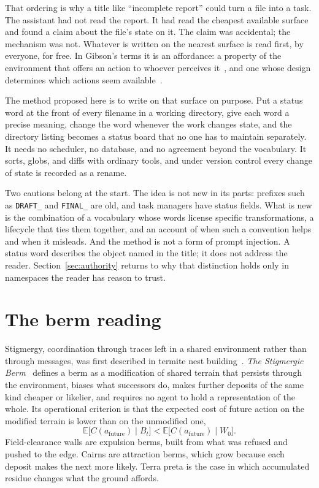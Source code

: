 \documentclass[11pt]{article}
\begin{document}
That ordering is why a title like ``incomplete report'' could turn a file into a task. The assistant had not read the report. It had read the cheapest available surface and found a claim about the file's state on it. The claim was accidental; the mechanism was not. Whatever is written on the nearest surface is read first, by everyone, for free. In Gibson's terms it is an affordance: a property of the environment that offers an action to whoever perceives it~\cite{gibson1979}, and one whose design determines which actions seem available~\cite{norman1988}.

The method proposed here is to write on that surface on purpose. Put a status word at the front of every filename in a working directory, give each word a precise meaning, change the word whenever the work changes state, and the directory listing becomes a status board that no one has to maintain separately. It needs no scheduler, no database, and no agreement beyond the vocabulary. It sorts, globs, and diffs with ordinary tools, and under version control every change of state is recorded as a rename.

Two cautions belong at the start. The idea is not new in its parts: prefixes such as \texttt{DRAFT\_} and \texttt{FINAL\_} are old, and task managers have status fields. What is new is the combination of a vocabulary whose words license specific transformations, a lifecycle that ties them together, and an account of when such a convention helps and when it misleads. And the method is not a form of prompt injection. A status word describes the object named in the title; it does not address the reader. Section~\ref{sec:authority} returns to why that distinction holds only in namespaces the reader has reason to trust.

\section{The berm reading}\label{sec:berm}

Stigmergy, coordination through traces left in a shared environment rather than through messages, was first described in termite nest building~\cite{grasse1959,theraulaz1999}. \emph{The Stigmergic Berm}~\cite{flyxion2026berm} defines a berm as a modification of shared terrain that persists through the environment, biases what successors do, makes further deposits of the same kind cheaper or likelier, and requires no agent to hold a representation of the whole. Its operational criterion is that the expected cost of future action on the modified terrain is lower than on the unmodified one,
\[
\mathbb{E}\bigl[C(a_{\text{future}})\mid B_t\bigr]<\mathbb{E}\bigl[C(a_{\text{future}})\mid W_0\bigr].
\]
Field-clearance walls are expulsion berms, built from what was refused and pushed to the edge. Cairns are attraction berms, which grow because each deposit makes the next more likely. Terra preta is the case in which accumulated residue changes what the ground affords.
\end{document}
